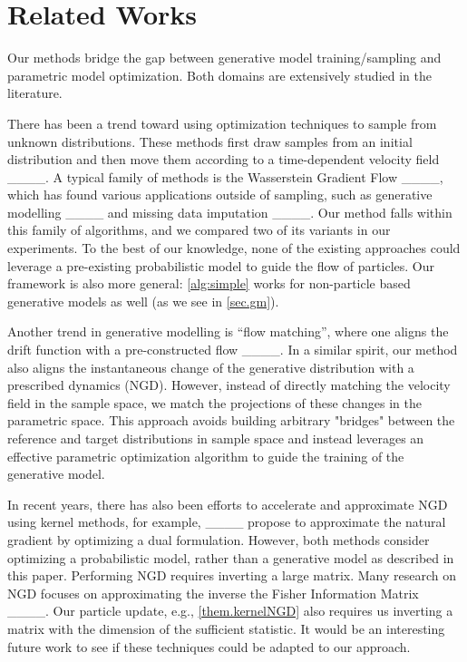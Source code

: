 \section{Related Works}
Our methods bridge the gap between generative model training/sampling and parametric model optimization. Both domains are extensively studied in the literature. 

There has been a trend toward using optimization techniques to sample from unknown distributions. These methods first draw samples from an initial distribution and then move them according to a time-dependent velocity field ____. A typical family of methods is the Wasserstein Gradient Flow ____, which has found various applications outside of sampling, such as generative modelling ____ and missing data imputation ____. Our method falls within this family of algorithms, and we compared two of its variants in our experiments. 
To the best of our knowledge, none of the existing approaches could leverage a pre-existing probabilistic model to guide the flow of particles. Our framework is also more general: \cref{alg:simple} works for non-particle based generative models as well (as we see in \cref{sec.gm}). 

Another trend in generative modelling is ``flow matching'', where one aligns the drift function with a pre-constructed flow ____. In a similar spirit, our method also aligns the instantaneous change of the generative  distribution with a prescribed dynamics (NGD). However, instead of directly matching the velocity field in the sample space, we match the projections of these changes in the parametric space. This approach avoids building arbitrary "bridges" between the reference and target distributions in sample space and instead leverages an effective parametric optimization algorithm to guide the training of the generative model.

In recent years, there has also been efforts to accelerate and approximate NGD using kernel methods, for example,   ____ propose to approximate the natural gradient by optimizing a dual formulation. 
However, both methods consider optimizing a probabilistic model, rather than a generative model as described in this paper. Performing NGD requires inverting a large matrix. 
Many research on NGD focuses on approximating the inverse the Fisher Information Matrix ____. 
Our particle update, e.g., \cref{them.kernelNGD} also requires us inverting a matrix with the dimension of the sufficient statistic. 
It would be an interesting future work to see if these techniques could be adapted to our approach.